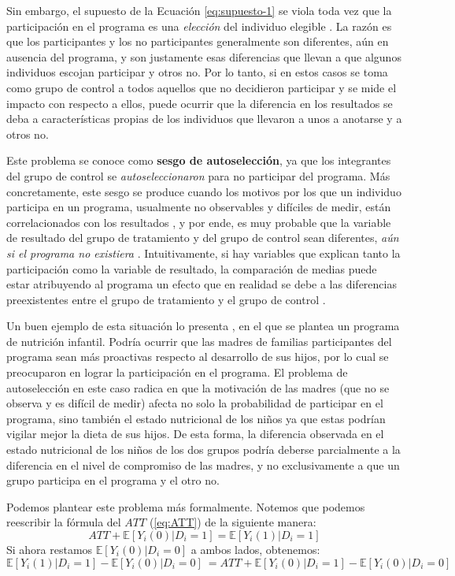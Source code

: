 \documentclass[../../main.tex]{subfiles}
\begin{document}
Sin embargo, el supuesto de la Ecuación \ref{eq:supuesto-1} se viola toda vez que la
participación en el programa es una \textit{elección} del individuo elegible
\cite{bernal}. La razón es que los participantes y los no participantes generalmente son
diferentes, aún en ausencia del programa, y son justamente esas diferencias que llevan a
que algunos individuos escojan participar y otros no. Por lo tanto, si en estos casos se
toma como grupo de control a todos aquellos que no decidieron participar y se mide el
impacto con respecto a ellos, puede ocurrir que la diferencia en los resultados se deba a
características propias de los individuos que llevaron a unos a anotarse y a otros no.

Este problema se conoce como \textbf{sesgo de autoselección}, ya que los integrantes del
grupo de control se \textit{autoseleccionaron} para no participar del programa. Más
concretamente, este sesgo se produce cuando los motivos por los que un individuo participa
en un programa, usualmente no observables y difíciles de medir, están correlacionados con
los resultados \cite{gertler-2016}, y por ende, es muy probable que la variable de
resultado del grupo de tratamiento y del grupo de control sean diferentes, \textit{aún si
el programa no existiera} \cite{bernal}. Intuitivamente, si hay variables que explican
tanto la participación como la variable de resultado, la comparación de medias puede estar
atribuyendo al programa un efecto que en realidad se debe a las diferencias preexistentes
entre el grupo de tratamiento y el grupo de control \cite{bernal}.

Un buen ejemplo de esta situación lo presenta \cite{bernal}, en el que se plantea un
programa de nutrición infantil. Podría ocurrir que las madres de familias participantes
del programa sean más proactivas respecto al desarrollo de sus hijos, por lo cual se
preocuparon en lograr la participación en el programa. El problema de autoselección en
este caso radica en que la motivación de las madres (que no se observa y es difícil de
medir) afecta no solo la probabilidad de participar en el programa, sino también el estado
nutricional de los niños ya que estas podrían vigilar mejor la dieta de sus hijos. De esta
forma, la diferencia observada en el estado nutricional de los niños de los dos grupos
podría deberse parcialmente a la diferencia en el nivel de compromiso de las madres, y no
exclusivamente a que un grupo participa en el programa y el otro no.

Podemos plantear este problema más formalmente. Notemos que podemos reescribir la fórmula
del \(ATT\) (\ref{eq:ATT}) de la siguiente manera:
\begin{equation}
    ATT + \mathbb{E} \left[Y_i(0)|D_i=1\right] = \mathbb{E} \left[Y_i(1)|D_i=1\right]
    \label{eq:ATT2}
\end{equation}
Si ahora restamos \(\mathbb{E} \left[Y_i(0)|D_i=0\right]\) a ambos lados, obtenemos:
\begin{equation}
    \mathbb{E} \left[Y_i(1)|D_i=1\right] - \mathbb{E} \left[Y_i(0)|D_i=0\right]\ =
    ATT + \mathbb{E} \left[Y_i(0)|D_i=1\right] - \mathbb{E} \left[Y_i(0)|D_i=0\right]\
    \label{eq:ATT3}
\end{equation}
\end{document}
